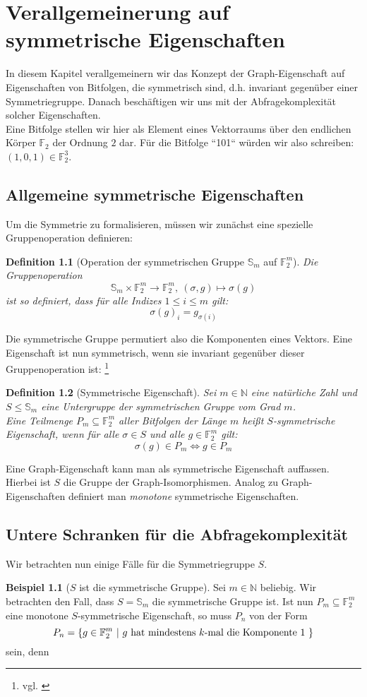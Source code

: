 \documentclass[a4paper]{scrreprt}
\newtheorem{definition}{Definition}
\theoremstyle{definition}
\newtheorem{example}{Beispiel}
\begin{document}
\chapter{Verallgemeinerung auf symmetrische Eigenschaften}
In diesem Kapitel verallgemeinern wir das Konzept der
Graph-Eigenschaft auf Eigenschaften von Bitfolgen, die
symmetrisch sind, d.h. invariant gegenüber einer Symmetriegruppe.
Danach beschäftigen wir uns mit der Abfragekomplexität
solcher Eigenschaften. \\
Eine Bitfolge stellen wir hier als Element eines Vektorraums
über den endlichen Körper $\mathbb{F}_2$ der Ordnung $2$ dar.
Für die Bitfolge ``101`` würden wir also schreiben:
$ (1,0,1) \in \mathbb{F}_2^3$.

\section{Allgemeine symmetrische Eigenschaften}
Um die Symmetrie zu formalisieren, müssen wir zunächst
eine spezielle Gruppenoperation definieren:

\begin{definition}
[Operation der symmetrischen Gruppe $\mathbb{S}_m$ auf $\mathbb{F}_2^m$]
Die Gruppenoperation
$$\mathbb{S}_m \times \mathbb{F}_2^m \to \mathbb{F}_2^m, \ (\sigma,g) \mapsto \sigma(g)$$
ist so definiert, dass für alle Indizes $1\leq i \leq m$ gilt:
$$ \sigma(g)_i = g_{\sigma(i)} $$
\end{definition}
Die symmetrische Gruppe permutiert also die Komponenten eines
Vektors. Eine Eigenschaft ist nun symmetrisch, wenn sie invariant
gegenüber dieser Gruppenoperation ist:
\footnote{vgl. \cite[S.7]{Rivest}}

\begin{definition}[Symmetrische Eigenschaft]
Sei $m\in \mathbb{N}$ eine natürliche Zahl und
$S \leq \mathbb{S}_m$ eine Untergruppe der 
symmetrischen Gruppe vom Grad $m$. \\
Eine Teilmenge
$P_m \subseteq \mathbb{F}_2^m$ aller Bitfolgen der
Länge $m$ heißt \emph{$S$-symmetrische Eigenschaft}, wenn
für alle $\sigma \in S$ und alle $g\in \mathbb{F}_2^m$ gilt:
$$ \sigma(g)\in P_m \iff g \in P_m $$ 
\end{definition}

Eine Graph-Eigenschaft kann man als symmetrische
Eigenschaft auffassen. Hierbei ist $S$ die Gruppe
der Graph-Isomorphismen.
Analog zu Graph-Eigenschaften definiert man
\emph{monotone} symmetrische Eigenschaften.

\section{Untere Schranken für die Abfragekomplexität}
Wir betrachten nun einige Fälle für die Symmetriegruppe
$S$.
\begin{example}[$S$ ist die symmetrische Gruppe]
Sei $m\in \mathbb{N}$ beliebig.
Wir betrachten den Fall, dass $S=\mathbb{S}_m$
die symmetrische Gruppe ist. Ist nun 
$P_m\subseteq \mathbb{F}_2^m$ eine monotone 
$S$-symmetrische Eigenschaft, so muss 
$P_n$ von der Form 
$$ P_n = \{ g\in \mathbb{F}_2^m \ |
\ g \textup{ hat mindestens } k\textup{-mal die Komponente } 1 \ \}$$
sein, denn
\end{example}
\end{document}
